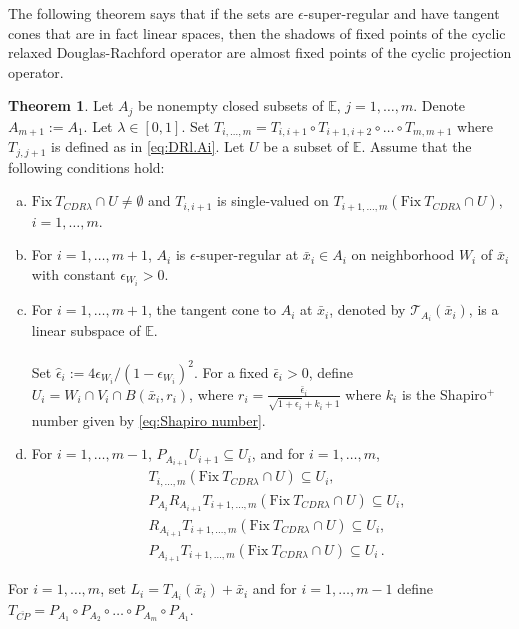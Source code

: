 \documentclass[12pt]{article}
\theoremstyle{definition}
\newtheorem{theorem}{Theorem}
\newcommand{\Ebb}{\mathbb{E}}
\newcommand{\Fix}{\mathrm{Fix}\ }
\begin{document}
The following theorem says that if the sets are $\epsilon$-super-regular   and have tangent cones that are in
fact linear spaces, then
the shadows of fixed points of the cyclic relaxed Douglas-Rachford operator are almost fixed points
of the cyclic projection operator.
\begin{theorem}\label{theo:shadow.fixed.point.subset.CP.noise}
Let $A_j$ be nonempty closed subsets of $\mathbb E$, $j=1,\dots,m$.
Denote $A_{m+1}:=A_1$.
Let $\lambda\in[0,1]$.
Set $T_{i,\dots,m}=T_{i,i+1}\circ T_{i+1,i+2}\circ\dots\circ T_{m,m+1}$ where $T_{j,j+1}$ is defined as in \eqref{eq:DRl.Ai}.
Let $U$ be a subset of $\mathbb E$. 
Assume that the following conditions hold:
\begin{enumerate}[(a)]
    \item $\Fix T_{CDR\lambda}\cap U\neq\emptyset$ and  $T_{i,i+1}$ is single-valued on $T_{i+1,\dots,m}(\Fix T_{CDR\lambda}\cap U)$, $i=1,\dots,m$.
    \item For $i=1,\dots,m+1$, $A_i$ is $\epsilon$-super-regular  at $\bar x_i\in A_i$ on
    neighborhood $W_i$ of $\bar x_i$ with constant $\epsilon_{W_i}>0$.
    \item For $i=1,\dots,m+1$, the tangent cone to $A_i$ at $\bar x_i$,
    denoted by $\mathcal{T}_{A_i}(\bar x_i)$, is a linear subspace of $\Ebb$.\\~\\
Set $\hat{\epsilon}_i:= 4\epsilon_{W_i}/(1-\epsilon_{W_i})^2.$
For a fixed $\bar\epsilon_i>0$, define $U_i=W_i\cap V_i\cap B(\bar x_i,r_i)$,
where $r_i=\frac{\bar\epsilon_i}{\sqrt{1+\hat{\epsilon}_i}+k_i+1}$
where $k_i$ is the Shapiro$^+$ number  given by \eqref{eq:Shapiro number}.
    \item For $i=1,\dots,m-1$, $P_{A_{i+1}}U_{i+1}
    \subseteq U_i$, and for $i=1,\dots,m$,
\begin{equation}%
\begin{array}{rl}
&T_{i,\dots,m}(\Fix T_{CDR\lambda}\cap U)\subseteq U_i,\\[5pt]
&P_{A_i}R_{A_{i+1}}T_{i+1,\dots,m}(\Fix T_{CDR\lambda}\cap U)\subseteq U_i,\\[5pt]
&R_{A_{i+1}}T_{i+1,\dots,m}(\Fix T_{CDR\lambda}\cap U)\subseteq U_i,\\[5pt]
&P_{A_{i+1}}T_{i+1,\dots,m}(\Fix T_{CDR\lambda}\cap U)\subseteq U_i\,.
\end{array}
\end{equation}
\end{enumerate}
For $i=1,\dots,m$, set $L_{i}=T_{A_{i}}(\bar x_{i})+\bar x_{i}$ and for $i=1,\dots,m-1$ define
$T_{\overline{CP}}=P_{A_1}\circ P_{A_2}\circ\dots\circ P_{A_{m}}\circ P_{A_1}$.


\end{theorem}
\end{document}
